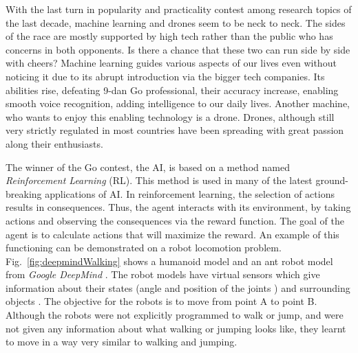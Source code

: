 With the last turn in popularity and practicality contest among research topics of the last decade, machine learning and drones seem to be neck to neck. The sides of the race are mostly supported by high tech rather than the public who has concerns in both opponents. Is there a chance that these two can run side by side with cheers? Machine learning guides various aspects of our lives even without noticing it due to its abrupt introduction via the bigger tech companies. Its abilities rise, defeating 9-dan Go professional, their accuracy increase, enabling smooth voice recognition, adding intelligence to our daily lives. Another machine, who wants to enjoy this enabling technology is a drone. Drones, although still very strictly regulated in most countries have been spreading with great passion along their enthusiasts. 
\fi

The winner of the Go contest, the AI, is based on a method named \emph{Reinforcement Learning} (RL). This method is used in many of the latest ground-breaking applications of AI. In reinforcement learning, the selection of actions results in consequences. Thus, the agent interacts with its environment, by taking actions and observing the consequences via the reward function. The goal of the agent is to calculate actions that will maximize the reward. An example of this functioning can be demonstrated on a robot locomotion problem. Fig.~\ref{fig:deepmindWalking} shows a humanoid model and an ant robot model from \emph{Google DeepMind} \cite{deepmindWebsiteHumonoidWalking,deepmindHumonoidWalkingStanford,deepmindHumonoidWalkingVideo}. The robot models have virtual sensors which give information about their states (angle and position of the joints \cite{deepmindHumonoidWalkingStanford}) and surrounding objects \cite{deepmindHumonoidWalkingVideo}. The objective for the robots is to move from point A to point B. Although the robots were not explicitly programmed to walk or jump, and were not given any information about what walking or jumping looks like, they learnt to move in a way very similar to walking and jumping.


